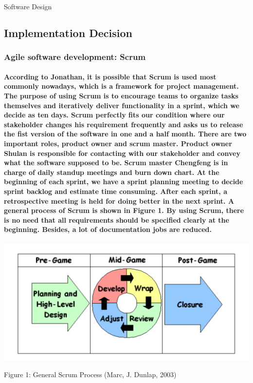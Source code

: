 \documentclass[12pt]{amsart}
\title{}
\author{}
\date{} %
\makeatletter
\renewcommand{\section}{\@startsection{section}{1}{0mm}
  {-\baselineskip}{0.5\baselineskip}{\bf\leftline}}
\makeatother
\begin{document}
\section{Software Design}

\subsection{\textbf{Implementation Decision}}

\subsubsection{\textbf{Agile software development: Scrum}}
\paragraph{According to Jonathan, it is possible that Scrum is used most commonly nowadays, which is a framework for project management. The purpose of using Scrum is to encourage teams to organize tasks themselves and iteratively deliver functionality in a sprint, which we decide as ten days. Scrum perfectly fits our condition where our stakeholder changes his requirement frequently and asks us to release the fist version of the software in one and a half month. There are two important roles, product owner and scrum master. Product owner Shulan is responsible for contacting with our stakeholder and convey what the software supposed to be. Scrum master Chengfeng is in charge of daily standup meetings and burn down chart. At the beginning of each sprint, we have a sprint planning meeting to decide sprint backlog and estimate time consuming. After each sprint, a retrospective meeting is held for doing better in the next sprint. A general process of Scrum is shown in Figure 1. By using Scrum, there is no need that all requirements should be specified clearly at the beginning. Besides, a lot of documentation jobs are reduced.}

\begin{center}
\includegraphics[width=0.8\linewidth]{scrum.png}
\centerline{Figure 1: General Scrum Process (Marc, J. Dunlap, 2003)}
\end{center}
\end{document}
